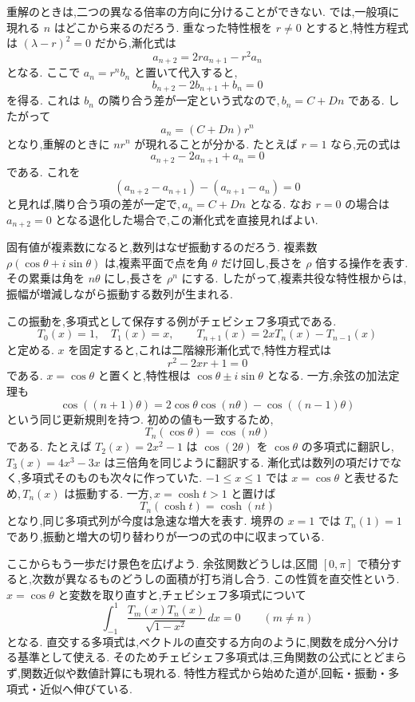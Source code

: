 重解のときは,二つの異なる倍率の方向に分けることができない.
では,一般項に現れる $n$ はどこから来るのだろう.
重なった特性根を $r\ne0$ とすると,特性方程式は $(\lambda-r)^2=0$ だから,漸化式は
\[
  a_{n+2}=2r a_{n+1}-r^2a_n
\]
となる.
ここで $a_n=r^n b_n$ と置いて代入すると,
\[
  b_{n+2}-2b_{n+1}+b_n=0
\]
を得る.
これは $b_n$ の隣り合う差が一定という式なので,\,$b_n=C+Dn$ である.
したがって
\[
  a_n=(C+Dn)r^n
\]
となり,重解のときに $nr^n$ が現れることが分かる.
たとえば $r=1$ なら,元の式は
\[
  a_{n+2}-2a_{n+1}+a_n=0
\]
である.
これを
\[
  (a_{n+2}-a_{n+1})-(a_{n+1}-a_n)=0
\]
と見れば,隣り合う項の差が一定で,\,$a_n=C+Dn$ となる.
なお $r=0$ の場合は $a_{n+2}=0$ となる退化した場合で,この漸化式を直接見ればよい.

固有値が複素数になると,数列はなぜ振動するのだろう.
複素数 $\rho(\cos\theta+i\sin\theta)$ は,複素平面で点を角 $\theta$ だけ回し,長さを $\rho$ 倍する操作を表す.
その累乗は角を $n\theta$ にし,長さを $\rho^n$ にする.
したがって,複素共役な特性根からは,振幅が増減しながら振動する数列が生まれる.

この振動を,多項式として保存する例がチェビシェフ多項式である.
\[
  T_0(x)=1,\quad T_1(x)=x,\qquad
  T_{n+1}(x)=2xT_n(x)-T_{n-1}(x)
\]
と定める.
$x$ を固定すると,これは二階線形漸化式で,特性方程式は
\[
  r^2-2xr+1=0
\]
である.
$x=\cos\theta$ と置くと,特性根は $\cos\theta\pm i\sin\theta$ となる.
一方,余弦の加法定理も
\[
  \cos((n+1)\theta)
  =2\cos\theta\cos(n\theta)-\cos((n-1)\theta)
\]
という同じ更新規則を持つ.
初めの値も一致するため,
\[
  T_n(\cos\theta)=\cos(n\theta)
\]
である.
たとえば $T_2(x)=2x^2-1$ は $\cos(2\theta)$ を $\cos\theta$ の多項式に翻訳し,\,$T_3(x)=4x^3-3x$ は三倍角を同じように翻訳する.
漸化式は数列の項だけでなく,多項式そのものも次々に作っていた.
$-1\le x\le1$ では $x=\cos\theta$ と表せるため,\,$T_n(x)$ は振動する.
一方,\,$x=\cosh t>1$ と置けば
\[
  T_n(\cosh t)=\cosh(nt)
\]
となり,同じ多項式列が今度は急速な増大を表す.
境界の $x=1$ では $T_n(1)=1$ であり,振動と増大の切り替わりが一つの式の中に収まっている.

ここからもう一歩だけ景色を広げよう.
余弦関数どうしは,区間 $[0,\pi]$ で積分すると,次数が異なるものどうしの面積が打ち消し合う.
この性質を直交性という.
$x=\cos\theta$ と変数を取り直すと,チェビシェフ多項式について
\[
  \int_{-1}^{1}
  \frac{T_m(x)T_n(x)}{\sqrt{1-x^2}}\,dx=0
  \qquad(m\ne n)
\]
となる.
直交する多項式は,ベクトルの直交する方向のように,関数を成分へ分ける基準として使える.
そのためチェビシェフ多項式は,三角関数の公式にとどまらず,関数近似や数値計算にも現れる.
特性方程式から始めた道が,回転・振動・多項式・近似へ伸びている.
